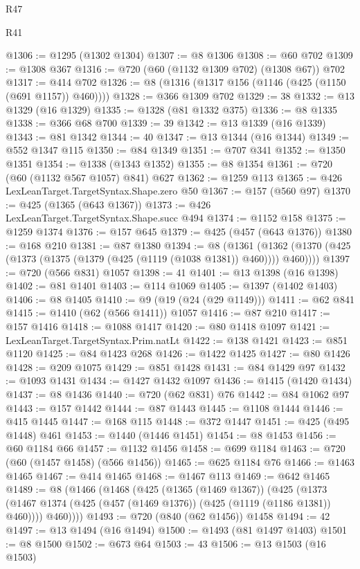 \begin{lexlean}{R47}
\begin{lexlean}{R41}
\begin{coremodule}
{{{{{{{{{{{{{{{{{{{{{{{{{{{{{{{{{{{{{{{{{{{{{{{{{{{{{{{{{{{{{{{{{{{{{{{{{{{{{{{{{{{{{{{@1306 := @1295 (@1302 @1304)
@1307 := @8 @1306
@1308 := @60 @702
@1309 := @1308 @367
@1316 := @720 (@60 (@1132 @1309 @702) (@1308 @67)) @702
@1317 := @414 @702
@1326 := @8 (@1316 (@1317 @156 (@1146 (@425 (@1150 (@691 @1157)) @460))))
@1328 := @366 @1309 @702
@1329 := 38
@1332 := @13 @1329 (@16 @1329)
@1335 := @1328 (@81 @1332 @375)
@1336 := @8 @1335
@1338 := @366 @68 @700
@1339 := 39
@1342 := @13 @1339 (@16 @1339)
@1343 := @81 @1342
@1344 := 40
@1347 := @13 @1344 (@16 @1344)
@1349 := @552 @1347 @115
@1350 := @84 @1349
@1351 := @707 @341
@1352 := @1350 @1351
@1354 := @1338 (@1343 @1352)
@1355 := @8 @1354
@1361 := @720 (@60 (@1132 @567 @1057) @841) @627
@1362 := @1259 @113
@1365 := @426 LexLeanTarget.TargetSyntax.Shape.zero @50
@1367 := @157 (@560 @97)
@1370 := @425 (@1365 (@643 @1367))
@1373 := @426 LexLeanTarget.TargetSyntax.Shape.succ @494
@1374 := @1152 @158
@1375 := @1259 @1374
@1376 := @157 @645
@1379 := @425 (@457 (@643 @1376))
@1380 := @168 @210
@1381 := @87 @1380
@1394 := @8
    (@1361 (@1362 (@1370 (@425 (@1373 (@1375 (@1379 (@425 (@1119 (@1038 @1381)) @460)))) @460))))
@1397 := @720 (@566 @831) @1057
@1398 := 41
@1401 := @13 @1398 (@16 @1398)
@1402 := @81 @1401
@1403 := @114 @1069
@1405 := @1397 (@1402 @1403)
@1406 := @8 @1405
@1410 := @9 (@19 (@24 (@29 @1149)))
@1411 := @62 @841
@1415 := @1410 (@62 (@566 @1411)) @1057
@1416 := @87 @210
@1417 := @157 @1416
@1418 := @1088 @1417
@1420 := @80 @1418 @1097
@1421 := LexLeanTarget.TargetSyntax.Prim.natLt
@1422 := @138 @1421
@1423 := @851 @1120
@1425 := @84 @1423 @268
@1426 := @1422 @1425
@1427 := @80 @1426
@1428 := @209 @1075
@1429 := @851 @1428
@1431 := @84 @1429 @97
@1432 := @1093 @1431
@1434 := @1427 @1432 @1097
@1436 := @1415 (@1420 @1434)
@1437 := @8 @1436
@1440 := @720 (@62 @831) @76
@1442 := @84 @1062 @97
@1443 := @157 @1442
@1444 := @87 @1443
@1445 := @1108 @1444
@1446 := @415 @1445
@1447 := @168 @115
@1448 := @372 @1447
@1451 := @425 (@495 @1448) @461
@1453 := @1440 (@1446 @1451)
@1454 := @8 @1453
@1456 := @60 @1184 @66
@1457 := @1132 @1456
@1458 := @699 @1184
@1463 := @720 (@60 (@1457 @1458) (@566 @1456))
@1465 := @625 @1184 @76
@1466 := @1463 @1465
@1467 := @414 @1465
@1468 := @1467 @113
@1469 := @642 @1465
@1489 := @8
    (@1466
      (@1468
        (@425
          (@1365 (@1469 @1367))
          (@425
            (@1373 (@1467 @1374 (@425 (@457 (@1469 @1376)) (@425 (@1119 (@1186 @1381)) @460))))
            @460))))
@1493 := @720 (@840 (@62 @1456)) @1458
@1494 := 42
@1497 := @13 @1494 (@16 @1494)
@1500 := @1493 (@81 @1497 @1403)
@1501 := @8 @1500
@1502 := @673 @64
@1503 := 43
@1506 := @13 @1503 (@16 @1503)
}}}}}}}}}}}}}}}}}}}}}}}}}}}}}}}}}}}}}}}}}}}}}}}}}}}}}}}}}}}}}}}}}}}}}}}}}}}}}}}}}}}}}}}
\end{coremodule}
\end{lexlean}
\end{lexlean}
